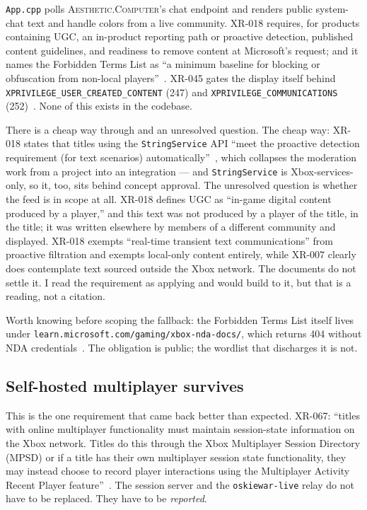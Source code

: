 \documentclass[10pt,letterpaper,twocolumn]{article}
\newcommand{\ac}{\textsc{Aesthetic.Computer}}
\newcommand{\code}[1]{\texttt{#1}}
\begin{document}
\code{App.cpp} polls \ac{}'s chat endpoint and renders public system-chat text and handle colors from a live community. XR-018 requires, for products containing UGC, an in-product reporting path or proactive detection, published content guidelines, and readiness to remove content at Microsoft's request; and it names the Forbidden Terms List as ``a minimum baseline for blocking or obfuscation from non-local players''~\cite{msXR018}. XR-045 gates the display itself behind \code{XPRIVILEGE\_USER\_CREATED\_CONTENT} (247) and \code{XPRIVILEGE\_COMMUNICATIONS} (252)~\cite{msXR}. None of this exists in the codebase.

There is a cheap way through and an unresolved question. The cheap way: XR-018 states that titles using the \code{StringService} API ``meet the proactive detection requirement (for text scenarios) automatically''~\cite{msXR018,msStringService}, which collapses the moderation work from a project into an integration --- and \code{StringService} is Xbox-services-only, so it, too, sits behind concept approval. The unresolved question is whether the feed is in scope at all. XR-018 defines UGC as ``in-game digital content produced by a player,'' and this text was not produced by a player of the title, in the title; it was written elsewhere by members of a different community and displayed. XR-018 exempts ``real-time transient text communications'' from proactive filtration and exempts local-only content entirely, while XR-007 clearly does contemplate text sourced outside the Xbox network. The documents do not settle it. I read the requirement as applying and would build to it, but that is a reading, not a citation.

Worth knowing before scoping the fallback: the Forbidden Terms List itself lives under \code{learn.\allowbreak microsoft.\allowbreak com/\allowbreak gaming/\allowbreak xbox-nda-docs/}, which returns 404 without NDA credentials~\cite{msForbiddenTerms}. The obligation is public; the wordlist that discharges it is not.

\subsection{Self-hosted multiplayer survives}

This is the one requirement that came back better than expected. XR-067: ``titles with online multiplayer functionality must maintain session-state information on the Xbox network. Titles do this through the Xbox Multiplayer Session Directory (MPSD) or if a title has their own multiplayer session state functionality, they may instead choose to record player interactions using the Multiplayer Activity Recent Player feature''~\cite{msXR}. The session server and the \code{oskiewar-live} relay do not have to be replaced. They have to be \emph{reported}.
\end{document}
